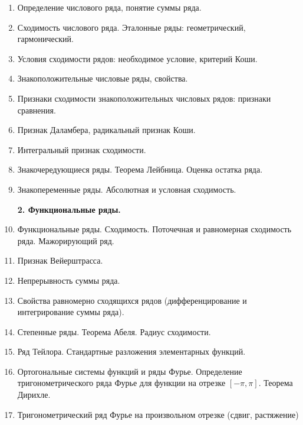 \documentclass[12pt]{article}
\begin{document}
\begin{enumerate}
    \item Определение числового ряда, понятие суммы ряда.
    \item Сходимость числового ряда. Эталонные ряды: геометрический, гармонический.
    \item Условия сходимости рядов: необходимое условие, критерий Коши.
    \item Знакоположительные числовые ряды, свойства.
    \item Признаки сходимости знакоположительных числовых рядов: признаки сравнения.
    \item Признак Даламбера, радикальный признак Коши.
    \item Интегральный признак сходимости.
    \item Знакочередующиеся ряды. Теорема Лейбница. Оценка остатка ряда.
    \item Знакопеременные ряды. Абсолютная и условная сходимость.

\begin{center}
    \textbf{2. Функциональные ряды.}
\end{center}

    \item Функциональные ряды. Сходимость. Поточечная и равномерная сходимость ряда.
    Мажорирующий ряд.
    \item Признак Вейерштрасса.
    \item Непрерывность суммы ряда.
    \item Свойства равномерно сходящихся рядов (дифференцирование и интегрирование суммы
    ряда).
    \item Степенные ряды. Теорема Абеля. Радиус сходимости.
    \item Ряд Тейлора. Стандартные разложения элементарных функций.
    \item Ортогональные системы функций и ряды Фурье. Определение тригонометрического ряда
    Фурье для функции на отрезке $[-\pi, \pi]$. Теорема Дирихле.
    \item Тригонометрический ряд Фурье на произвольном отрезке (сдвиг, растяжение)
\end{enumerate}
\end{document}
